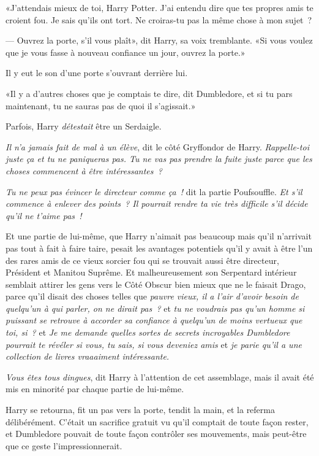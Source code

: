 «J'attendais mieux de toi, Harry Potter. J'ai entendu dire que tes propres amis te croient fou. Je sais qu'ils ont tort. Ne croiras-tu pas la même chose à mon sujet~?

--- Ouvrez la porte, s'il vous plaît», dit Harry, sa voix tremblante. «Si vous voulez que je vous fasse à nouveau confiance un jour, ouvrez la porte.»

Il y eut le son d'une porte s'ouvrant derrière lui.

«Il y a d'autres choses que je comptais te dire, dit Dumbledore, et si tu pars maintenant, tu ne sauras pas de quoi il s'agissait.»

Parfois, Harry \emph{détestait} être un Serdaigle.

\emph{Il n'a jamais fait de mal à un élève}, dit le côté Gryffondor de Harry. \emph{Rappelle-toi juste ça et tu ne paniqueras pas. Tu ne vas pas prendre la fuite juste parce que les choses commencent à être intéressantes~?}

\emph{Tu ne peux pas évincer le directeur comme ça~!} dit la partie Poufsouffle. \emph{Et s'il commence à enlever des points~? Il pourrait rendre ta vie très difficile s'il décide qu'il ne t'aime pas~!}

Et une partie de lui-même, que Harry n'aimait pas beaucoup mais qu'il n'arrivait pas tout à fait à faire taire, pesait les avantages potentiels qu'il y avait à être l'un des rares amis de ce vieux sorcier fou qui se trouvait aussi être directeur, Président et Manitou Suprême. Et malheureusement son Serpentard intérieur semblait attirer les gens vers le Côté Obscur bien mieux que ne le faisait Drago, parce qu'il disait des choses telles que \emph{pauvre vieux, il a l'air d'avoir besoin de quelqu'un à qui parler, on ne dirait pas~?} et \emph{tu ne voudrais pas qu'un homme si puissant se retrouve à accorder sa confiance à quelqu'un de moins vertueux que toi, si~?} et \emph{Je me demande quelles sortes de secrets incroyables Dumbledore pourrait te révéler si vous, tu sais, si vous deveniez amis} et \emph{je parie qu'il a une collection de livres vraaaiment intéressante.}

\emph{Vous êtes tous dingues}, dit Harry à l'attention de cet assemblage, mais il avait été mis en minorité par chaque partie de lui-même.

Harry se retourna, fit un pas vers la porte, tendit la main, et la referma délibérément. C'était un sacrifice gratuit vu qu'il comptait de toute façon rester, et Dumbledore pouvait de toute façon contrôler ses mouvements, mais peut-être que ce geste l'impressionnerait.


